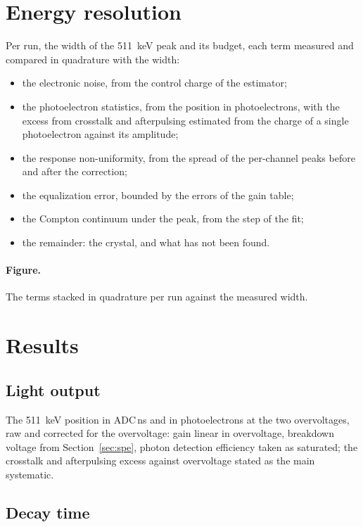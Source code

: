 \documentclass[11pt]{article}
\begin{document}
\section{Energy resolution}
\label{sec:resolution}

Per run, the width of the 511~keV peak and its budget, each term measured
and compared in quadrature with the width:
\begin{itemize}
\item the electronic noise, from the control charge of the estimator;
\item the photoelectron statistics, from the position in photoelectrons,
  with the excess from crosstalk and afterpulsing estimated from the
  charge of a single photoelectron against its amplitude;
\item the response non-uniformity, from the spread of the per-channel
  peaks before and after the correction;
\item the equalization error, bounded by the errors of the gain table;
\item the Compton continuum under the peak, from the step of the fit;
\item the remainder: the crystal, and what has not been found.
\end{itemize}

\paragraph{Figure.} The terms stacked in quadrature per run against the
measured width.

\section{Results}

\subsection{Light output}

The 511~keV position in ADC\,ns and in photoelectrons at the two
overvoltages, raw and corrected for the overvoltage: gain linear in
overvoltage, breakdown voltage from Section~\ref{sec:spe}, photon
detection efficiency taken as saturated; the crosstalk and afterpulsing
excess against overvoltage stated as the main systematic.

\subsection{Decay time}
\end{document}
